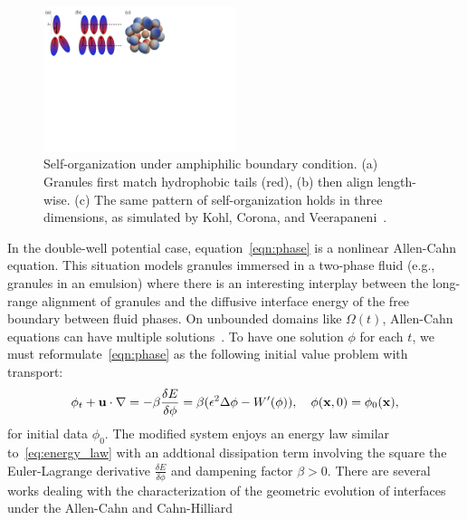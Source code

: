 \begin{figure}
  \vspace{-8pt}
  \centerline{\includegraphics[width=0.5\textwidth]{figures/SA1Figures/AmphiphilicAssembly.pdf}}
  \vspace{-8pt}
  \caption{\label{fig:amphiphilic_assembly} \footnotesize
  Self-organization under amphiphilic boundary condition. (a) Granules
  first match hydrophobic tails (red), (b) then align length-wise. (c)
  The same pattern of self-organization holds in three dimensions, as
  simulated by Kohl, Corona, and
  Veerapaneni~\cite{koh-cor-che-vee2021}.}
\end{figure}
In the double-well potential case, equation~\eqref{eqn:phase} is a
nonlinear Allen-Cahn equation. This situation models granules immersed
in a two-phase fluid (e.g., granules in an emulsion) where there is an
interesting interplay between the long-range alignment of granules and
the diffusive interface energy of the free boundary between fluid
phases. On unbounded domains like $\Omega(t)$, Allen-Cahn equations can
have multiple solutions~\cite{Alama1997StationaryLS,
Alikakos2008OnAE, Bronsard1993OnTB, Byeon2014SolutionsOH, Byeon2013OnAP,
Alessio2005ENTIRESI, Trumper2007ExistenceOA, Benci2019MultipleSF}.
To have one solution $\phi$ for each $t$, 
we must reformulate~\eqref{eqn:phase} as
the following initial value problem with transport:
\begin{align}
  \label{eqn:phase_transport}
  \phi_t + \mathbf{u} \cdot \nabla
  = -\beta \frac{\delta E}{\delta \phi}
  = \beta(\epsilon^2 \Delta \phi - W'(\phi)),
  \quad \phi(\mathbf{x},0) = \phi_0(\mathbf{x}),
\end{align}
for initial data $\phi_0$. The modified system enjoys an energy law
similar to~\eqref{eq:energy_law} with an addtional dissipation term
involving the square the Euler-Lagrange derivative $\frac{\delta
E}{\delta \phi}$ and dampening factor $\beta > 0$. There are several
works dealing with the characterization of the geometric evolution of
interfaces under the Allen-Cahn and Cahn-Hilliard
